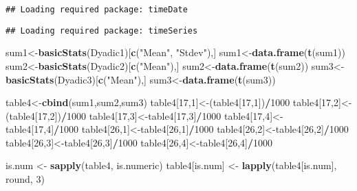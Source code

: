 \documentclass[]{article}
\newenvironment{Shaded}{\begin{snugshade}}{\end{snugshade}}
\newcommand{\KeywordTok}[1]{\textcolor[rgb]{0.13,0.29,0.53}{\textbf{#1}}}
\newcommand{\DecValTok}[1]{\textcolor[rgb]{0.00,0.00,0.81}{#1}}
\newcommand{\StringTok}[1]{\textcolor[rgb]{0.31,0.60,0.02}{#1}}
\newcommand{\OperatorTok}[1]{\textcolor[rgb]{0.81,0.36,0.00}{\textbf{#1}}}
\newcommand{\NormalTok}[1]{#1}
\begin{document}
\begin{verbatim}
## Loading required package: timeDate
\end{verbatim}

\begin{verbatim}
## Loading required package: timeSeries
\end{verbatim}

\begin{Shaded}
\begin{Highlighting}[]
\NormalTok{sum1<-}\KeywordTok{basicStats}\NormalTok{(Dyadic1)[}\KeywordTok{c}\NormalTok{(}\StringTok{"Mean"}\NormalTok{, }\StringTok{"Stdev"}\NormalTok{),]}
\NormalTok{sum1<-}\KeywordTok{data.frame}\NormalTok{(}\KeywordTok{t}\NormalTok{(sum1))}
\NormalTok{sum2<-}\KeywordTok{basicStats}\NormalTok{(Dyadic2)[}\KeywordTok{c}\NormalTok{(}\StringTok{"Mean"}\NormalTok{),]}
\NormalTok{sum2<-}\KeywordTok{data.frame}\NormalTok{(}\KeywordTok{t}\NormalTok{(sum2))}
\NormalTok{sum3<-}\KeywordTok{basicStats}\NormalTok{(Dyadic3)[}\KeywordTok{c}\NormalTok{(}\StringTok{"Mean"}\NormalTok{),]}
\NormalTok{sum3<-}\KeywordTok{data.frame}\NormalTok{(}\KeywordTok{t}\NormalTok{(sum3))}
\end{Highlighting}
\end{Shaded}

\begin{Shaded}
\begin{Highlighting}[]
\NormalTok{table4<-}\KeywordTok{cbind}\NormalTok{(sum1,sum2,sum3)}
\NormalTok{table4[}\DecValTok{17}\NormalTok{,}\DecValTok{1}\NormalTok{]<-(table4[}\DecValTok{17}\NormalTok{,}\DecValTok{1}\NormalTok{])}\OperatorTok{/}\DecValTok{1000}
\NormalTok{table4[}\DecValTok{17}\NormalTok{,}\DecValTok{2}\NormalTok{]<-(table4[}\DecValTok{17}\NormalTok{,}\DecValTok{2}\NormalTok{])}\OperatorTok{/}\DecValTok{1000}
\NormalTok{table4[}\DecValTok{17}\NormalTok{,}\DecValTok{3}\NormalTok{]<-table4[}\DecValTok{17}\NormalTok{,}\DecValTok{3}\NormalTok{]}\OperatorTok{/}\DecValTok{1000}
\NormalTok{table4[}\DecValTok{17}\NormalTok{,}\DecValTok{4}\NormalTok{]<-table4[}\DecValTok{17}\NormalTok{,}\DecValTok{4}\NormalTok{]}\OperatorTok{/}\DecValTok{1000} 
\NormalTok{table4[}\DecValTok{26}\NormalTok{,}\DecValTok{1}\NormalTok{]<-table4[}\DecValTok{26}\NormalTok{,}\DecValTok{1}\NormalTok{]}\OperatorTok{/}\DecValTok{1000} 
\NormalTok{table4[}\DecValTok{26}\NormalTok{,}\DecValTok{2}\NormalTok{]<-table4[}\DecValTok{26}\NormalTok{,}\DecValTok{2}\NormalTok{]}\OperatorTok{/}\DecValTok{1000}
\NormalTok{table4[}\DecValTok{26}\NormalTok{,}\DecValTok{3}\NormalTok{]<-table4[}\DecValTok{26}\NormalTok{,}\DecValTok{3}\NormalTok{]}\OperatorTok{/}\DecValTok{1000}
\NormalTok{table4[}\DecValTok{26}\NormalTok{,}\DecValTok{4}\NormalTok{]<-table4[}\DecValTok{26}\NormalTok{,}\DecValTok{4}\NormalTok{]}\OperatorTok{/}\DecValTok{1000}

\NormalTok{is.num <-}\StringTok{ }\KeywordTok{sapply}\NormalTok{(table4, is.numeric)}
\NormalTok{table4[is.num] <-}\StringTok{ }\KeywordTok{lapply}\NormalTok{(table4[is.num], round, }\DecValTok{3}\NormalTok{)}
\end{Highlighting}
\end{Shaded}
\end{document}
